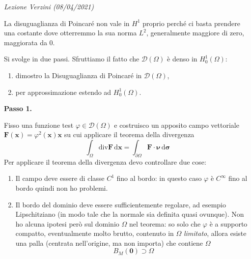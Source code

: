\documentclass[10pt,a4paper,twoside,openright]{book}
\newcounter{conteggioV}
\newcommand{\LezioneV}[1]{
	\stepcounter{conteggioV}
	\textit{Lezione Verzini \arabic{conteggioV} (#1)}
	}
\newcommand{\x}{\mathbf{x}}
\newcommand{\zer}{\mathbf{0}}
\newcommand{\sigg}{\bm{\sigma}}
\newcommand{\de}{\,\mathrm d}
\newcommand{\dxx}{\de \x}
\newcommand{\dsig}{\de \sigg}
\begin{document}
\LezioneV{08/04/2021}
\begin{oss}
	La disuguaglianza di Poincaré non vale in $H^{1} $ proprio perché ci basta prendere una costante dove otterremmo la sua norma $L^2$, generalmente maggiore di zero, maggiorata da $0$.
\end{oss}
\begin{dimostrazione}
	Si svolge in due passi. Sfruttiamo il fatto che $\mathcal{D}(\Omega)$ è denso in $H_{0}^{1}(\Omega)$:
	\begin{enumerate}
		\item dimostro la Disuguaglianza di Poincaré in $\mathcal{D}(\Omega)$,
		\item per approssimazione estendo ad $H_{0}^{1}(\Omega)$.
	\end{enumerate}
	
	\textbf{Passo 1.}
	
	Fisso una funzione test $\varphi \in \mathcal{D}(\Omega)$ e costruisco un apposito campo vettoriale $\boxed{\mathbf{F}(\x) =\varphi ^{2}(\x)\x}$ su cui applicare il teorema della divergenza
	\begin{equation*}
		\int _{\Omega }\mathrm{div}\mathbf{F} \dxx =\int _{\partial \Omega }\mathbf{F} \cdotp \bm{\nu } \dsig 
	\end{equation*}
	Per applicare il teorema della divergenza devo controllare due cose:
	\begin{enumerate}
		\item Il campo deve essere di classe $C^{1}$ fino al bordo: in questo caso $\varphi $ è $C^{\infty }$ fino al bordo quindi non ho problemi.
		\item Il bordo del dominio deve essere sufficientemente regolare, ad esempio Lipschitziano (in modo tale che la normale sia definita quasi ovunque). Non ho alcuna ipotesi però sul dominio $\Omega $ nel teorema: so solo che $\varphi $ è a supporto compatto, eventualmente molto brutto, contenuto in $\Omega $ \textit{limitato}, allora esiste una palla (centrata nell'origine, ma non importa) che contiene $\Omega $
		      \begin{equation*}
		      	B_{M}(\zer) \supset \Omega 
		      \end{equation*}
		      
		      \begin{figure}[H]
		      	\centering
		      	
		      	\begin{tikzpicture}[x=0.75pt,y=0.75pt,yscale=-1,xscale=1]
		      		

\end{tikzpicture}
\end{figure}
\end{enumerate}
\end{dimostrazione}
\end{document}
